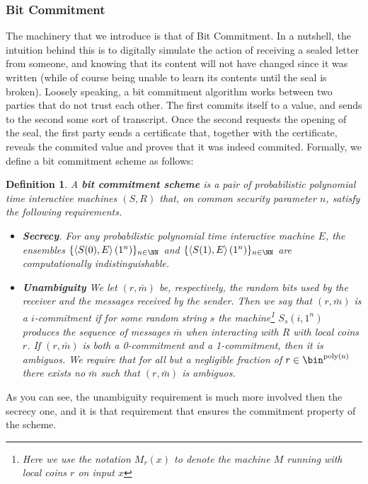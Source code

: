 \documentclass{article}
\newtheorem{definition}{Definition}
\begin{document}
\subsubsection{Bit Commitment}
The machinery that we introduce is that of Bit Commitment. In a nutshell, the intuition behind this
is to digitally simulate the action of receiving a sealed letter from someone, and knowing that its content will not have changed since it was written (while of course being unable to learn its contents until the seal is broken).
Loosely speaking, a bit commitment algorithm works between two parties that do not trust each other.
The first commits itself to a value, and sends to the second some sort of transcript. 
Once the second requests the opening of the seal, the first party sends a certificate that, together with the certificate, reveals the commited value and proves that it was indeed commited.
Formally, we define a bit commitment scheme as follows:
\begin{definition}
    A \textbf{bit commitment scheme} is a pair of probabilistic polynomial time interactive machines $(S, R)$ that,
    on common security parameter $n$, satisfy the following requirements.
    \begin{itemize}
        \item \textbf{Secrecy}. For any probabilistic polynomial time interactive machine $E$, 
            the ensembles $\{ \left<S(0), E\right>(1^n) \}_{n \in \NN}$ and $\{ \left<S(1), E\right>(1^n) \}_{n \in \NN}$ are computationally indistinguishable.
        \item \textbf{Unambiguity} We let $(r, \bar{m})$ be, respectively, the random bits used by the receiver and the messages received by the sender. 
                Then we say that $(r, \bar{m})$ is a $i$-commitment if for some random string $s$ the machine\footnote{Here we use the notation $M_r(x)$ to denote the machine $M$ running with local coins $r$ on input $x$} $S_s(i, 1^n)$ produces the sequence of messages $\bar{m}$ when interacting with $R$ with local coins $r$. 
                If $(r, \bar{m})$ is both a 0-commitment and a 1-commitment, then it is ambiguos. 
                We require that for all but a negligible fraction of $r \in \bin^{\text{poly(n)}}$ there exists no $\bar{m}$ such that $(r, \bar{m})$ is ambiguos.
    \end{itemize}
\end{definition}
As you can see, the unambiguity requirement is much more involved then the secrecy one, and it is that requirement that ensures the commitment property of the scheme.
\end{document}
